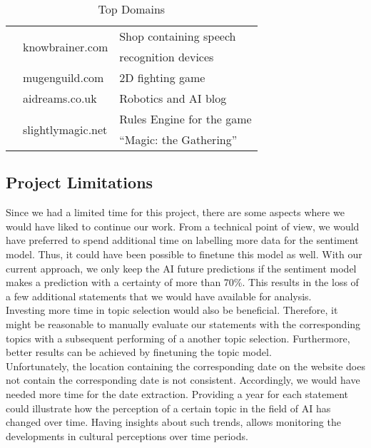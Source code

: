 \begin{table}
{\begin{tabular}{rll}
        \addlinespace[0.7em]
        \multirow{2}{*}{71\quad}  & \multirow{2}{*}{knowbrainer.com}        & Shop containing speech \\
                                  &                                         & recognition devices\\
        \addlinespace[0.7em]
        {58\quad}                 & mugenguild.com                          & 2D fighting game \\
        \addlinespace[0.7em]
        {52\quad}                 & aidreams.co.uk                          & Robotics and AI blog\\
        \addlinespace[0.7em]
        \multirow{2}{*}{51\quad}  & \multirow{2}{*}{slightlymagic.net}      & Rules Engine for the game \\
                                  &                                         & ``Magic: the Gathering'' \\
        \bottomrule
    \end{tabular}
    }
\caption{\label{Top-Domains}
Top Domains
}
\end{table}
\subsection{Project Limitations}

Since we had a limited time for this project, there are some aspects where we would have liked to continue our work.
From a technical point of view, we would have preferred to spend additional time on labelling more data for the sentiment model.
Thus, it could have been possible to finetune this model as well.
With our current approach, we only keep the AI future predictions if the sentiment model makes a prediction with a certainty of more than 70\%.
This results in the loss of a few additional statements that we would have available for analysis.
\\
Investing more time in topic selection would also be beneficial.
Therefore, it might be reasonable to manually evaluate our statements with the corresponding topics with a subsequent performing of a another topic selection.
Furthermore, better results can be achieved by finetuning the topic model.
\\
Unfortunately, the location containing the corresponding date on the website does not contain the corresponding date is not consistent.
Accordingly, we would have needed more time for the date extraction.
Providing a year for each statement could illustrate how the perception of a certain topic in the field of AI has changed over time.
Having insights about such trends, allows monitoring the developments in cultural perceptions over time periods.
\\





